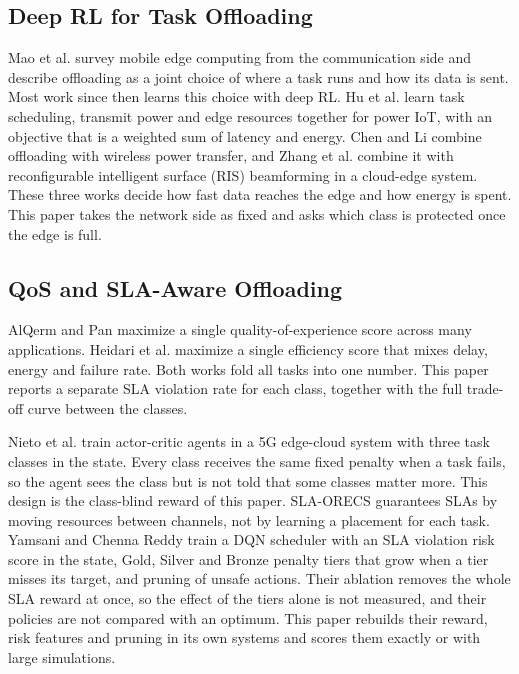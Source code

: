 \subsection{Deep RL for Task Offloading}
Mao et al. \cite{mao2017} survey mobile edge computing from the communication side and describe offloading as a joint choice of where a task runs and how its data is sent. Most work since then learns this choice with deep RL. Hu et al. \cite{hu2021} learn task scheduling, transmit power and edge resources together for power IoT, with an objective that is a weighted sum of latency and energy. Chen and Li \cite{chen2025} combine offloading with wireless power transfer, and Zhang et al. \cite{zhang2024} combine it with reconfigurable intelligent surface (RIS) beamforming in a cloud-edge system. These three works decide how fast data reaches the edge and how energy is spent. This paper takes the network side as fixed and asks which class is protected once the edge is full.

\subsection{QoS and SLA-Aware Offloading}
AlQerm and Pan \cite{alqerm2021} maximize a single quality-of-experience score across many applications. Heidari et al. \cite{heidari2023} maximize a single efficiency score that mixes delay, energy and failure rate. Both works fold all tasks into one number. This paper reports a separate SLA violation rate for each class, together with the full trade-off curve between the classes.

Nieto et al. \cite{nieto2024} train actor-critic agents in a 5G edge-cloud system with three task classes in the state. Every class receives the same fixed penalty when a task fails, so the agent sees the class but is not told that some classes matter more. This design is the class-blind reward of this paper. SLA-ORECS \cite{lan2024} guarantees SLAs by moving resources between channels, not by learning a placement for each task. Yamsani and Chenna Reddy \cite{yamsani2026} train a DQN scheduler with an SLA violation risk score in the state, Gold, Silver and Bronze penalty tiers that grow when a tier misses its target, and pruning of unsafe actions. Their ablation removes the whole SLA reward at once, so the effect of the tiers alone is not measured, and their policies are not compared with an optimum. This paper rebuilds their reward, risk features and pruning in its own systems and scores them exactly or with large simulations.

